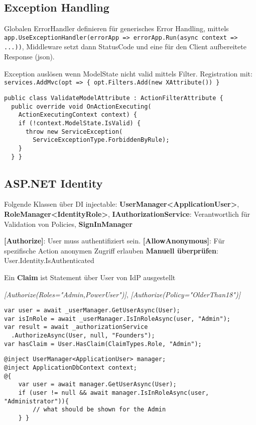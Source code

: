 \begin{multicols*}{2}
\subsection{Exception Handling}
Globalen ErrorHandler definieren für generisches Error Handling, mittels \lstinline|app.UseExceptionHandler(errorApp => errorApp.Run(async context => ...))|, Middleware setzt dann StatusCode und eine für den Client aufbereitete Response (json).

Exception auslösen wenn ModelState nicht valid mittels Filter.
Registration mit: \lstinline|services.AddMvc(opt => { opt.Filters.Add(new XAttribute()) }|
\begin{verbatim}
public class ValidateModelAttribute : ActionFilterAttribute {
  public override void OnActionExecuting(
    ActionExecutingContext context) {
    if (!context.ModelState.IsValid) {
      throw new ServiceException(
        ServiceExceptionType.ForbiddenByRule);
    }
  } }
\end{verbatim}

\subsection{ASP.NET Identity}
Folgende Klassen über DI injectable: \textbf{UserManager<ApplicationUser>}, \textbf{RoleManager<IdentityRole>}, \textbf{IAuthorizationService}: Verantwortlich für Validation von Policies, \textbf{SignInManager}

\textbf{[Authorize]}: User muss authentifiziert sein. \textbf{[AllowAnonymous]}: Für spezifische Action anonymen Zugriff erlauben
\textbf{Manuell überprüfen}: User.Identity.IsAuthenticated

Ein \textbf{Claim} ist Statement über User von IdP ausgestellt

\textit{[Authorize(Roles="Admin,PowerUser")]}, \textit{[Authorize(Policy="OlderThan18")]}

\begin{verbatim}
var user = await _userManager.GetUserAsync(User);
var isInRole = await _userManager.IsInRoleAsync(user, "Admin");
var result = await _authorizationService
  .AuthorizeAsync(User, null, "Founders");
var hasClaim = User.HasClaim(ClaimTypes.Role, "Admin");
\end{verbatim}
\begin{lstlisting}
@inject UserManager<ApplicationUser> manager;
@inject ApplicationDbContext context;
@{
    var user = await manager.GetUserAsync(User);
    if (user != null && await manager.IsInRoleAsync(user, "Administrator")){
        // what should be shown for the Admin
    } }
\end{lstlisting}


\end{multicols*}
